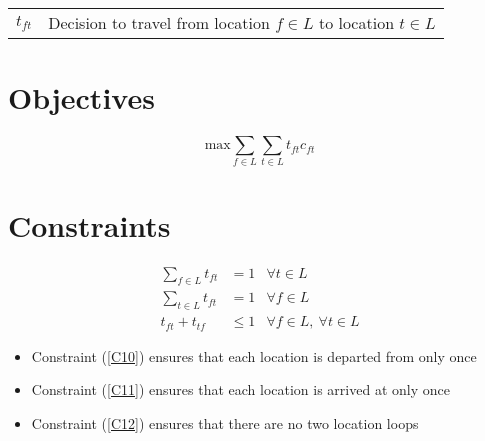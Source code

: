 \documentclass[a4paper]{article}
\begin{document}
\begin{tabular}{rl}
    $t_{ft}$ & Decision to travel from location $f \in L$ to location $t \in L$
\end{tabular}

\section*{Objectives}

\[
\text{max} \sum_{f \in L} \sum_{t \in L} t_{ft} c_{ft}
\]

\section*{Constraints}

\begin{align}
\sum_{f \in L} t_{ft} & = 1 & \forall t \in L \label{C10}\\
\sum_{t \in L} t_{ft} & = 1 & \forall f \in L \label{C11}\\
t_{ft} +  t_{tf} & \leq 1 & \forall f \in L,\ \forall t \in L \label{C12}
\end{align}

\begin{itemize}
    \item Constraint (\ref{C10}) ensures that each location is departed from only once
    \item Constraint (\ref{C11}) ensures that each location is arrived at only once
    \item Constraint (\ref{C12}) ensures that there are no two location loops
\end{itemize}
\end{document}
